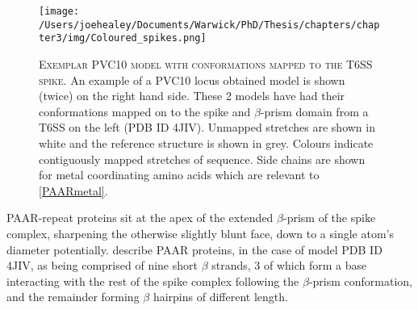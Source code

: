 \begin{figure}[h!]
\centering
\texttt{[image: /Users/joehealey/Documents/Warwick/PhD/Thesis/chapters/chapter3/img/Coloured\_spikes.png]}
\captionsetup{singlelinecheck=off, justification=justified, font=footnotesize, aboveskip=10pt}
\caption[A putative conformation of spike tip proteins]{\textsc{\normalsize Exemplar PVC10 model with conformations mapped to the T6SS spike.}\vspace{0.1cm} \newline An example of a PVC10 locus obtained model is shown (twice) on the right hand side. These 2 models have had their conformations mapped on to the spike and $\beta$-prism domain from a T6SS on the left (PDB ID 4JIV). Unmapped stretches are shown in white and the reference structure is shown in grey. Colours indicate contiguously mapped stretches of sequence. Side chains are shown for metal coordinating amino acids which are relevant to \vref{PAARmetal}.}  
	\label{PAAR}
\end{figure}


PAAR-repeat proteins sit at the apex of the extended $\beta$-prism of the spike complex, sharpening the otherwise slightly blunt face, down to a single atom's diameter potentially. \cite{Shneider2013} describe PAAR proteins, in the case of model PDB ID 4JIV, as being comprised of nine short $\beta$ strands, 3 of which form a base interacting with the rest of the spike complex following the $\beta$-prism conformation, and the remainder forming $\beta$ hairpins of different length.

